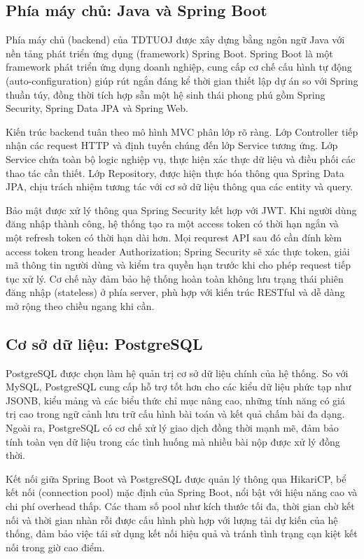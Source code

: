\documentclass[12pt, a4paper]{report}
\begin{document}
\subsection{Phía máy chủ: Java và Spring Boot}

Phía máy chủ (backend) của TDTUOJ được xây dựng bằng ngôn ngữ Java với nền tảng phát triển
ứng dụng (framework) Spring Boot. Spring Boot là một framework phát triển ứng dụng doanh
nghiệp, cung cấp cơ chế cấu hình tự động (auto-configuration) giúp rút ngắn
đáng kể thời gian thiết lập dự án so với Spring thuần túy, đồng thời tích hợp sẵn một hệ
sinh thái phong phú gồm Spring Security, Spring Data \ac{JPA} và Spring Web.

Kiến trúc backend tuân theo mô hình \ac{MVC} phân lớp rõ ràng. Lớp Controller tiếp nhận
các request \ac{HTTP} và định tuyến chúng đến lớp Service tương ứng. Lớp Service chứa toàn bộ
logic nghiệp vụ, thực hiện xác thực dữ liệu và điều phối các thao tác cần thiết. Lớp
Repository, được hiện thực hóa thông qua Spring Data \ac{JPA}, chịu trách nhiệm tương tác
với cơ sở dữ liệu thông qua các entity và query.

Bảo mật được xử lý thông qua Spring Security kết hợp với \ac{JWT}. Khi người dùng đăng
nhập thành công, hệ thống tạo ra một access token có thời hạn ngắn và một refresh token có
thời hạn dài hơn. Mọi requrest \ac{API} sau đó cần đính kèm access token trong header
Authorization; Spring Security sẽ xác thực token, giải mã thông tin người dùng và kiểm tra
quyền hạn trước khi cho phép request tiếp tục xử lý. Cơ chế này đảm bảo hệ thống hoàn toàn
không lưu trạng thái phiên đăng nhập (stateless) ở phía server, phù hợp với kiến trúc \ac{REST}ful
và dễ dàng mở rộng theo chiều ngang khi cần.

\subsection{Cơ sở dữ liệu: PostgreSQL}

PostgreSQL được chọn làm hệ quản trị cơ sở dữ liệu chính của hệ thống. So với MySQL,
PostgreSQL cung cấp hỗ trợ tốt hơn cho các kiểu dữ liệu phức tạp như JSONB, kiểu
mảng và các biểu thức chỉ mục nâng cao, những tính năng có giá trị cao trong ngữ cảnh
lưu trữ cấu hình bài toán và kết quả chấm bài đa dạng. Ngoài ra, PostgreSQL có cơ chế xử
lý giao dịch đồng thời mạnh mẽ, đảm bảo tính toàn vẹn dữ liệu trong các tình huống mà
nhiều bài nộp được xử lý đồng thời.

Kết nối giữa Spring Boot và PostgreSQL được quản lý thông qua HikariCP, bể kết nối
(connection pool) mặc định của Spring Boot, nổi bật với hiệu năng cao và chi phí overhead thấp. 
Các tham số pool như kích thước tối đa, thời gian chờ kết nối và thời
gian nhàn rỗi được cấu hình phù hợp với lượng tải dự kiến của hệ thống, đảm bảo việc tái sử dụng
kết nối hiệu quả và tránh tình trạng cạn kiệt kết nối trong giờ cao điểm.
\end{document}
